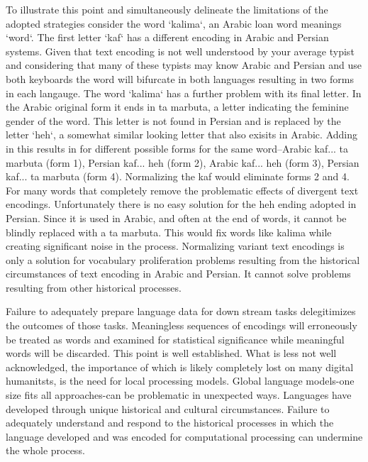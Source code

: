 \documentclass[12pt, oneside]{report}
\begin{document}
\par
To illustrate this point and simultaneously delineate the limitations of the adopted strategies consider the word `kalima`, an Arabic loan word meanings `word`. The first letter `kaf` has a different encoding in Arabic and Persian systems. Given that text encoding is not well understood by your average typist and considering that many of these typists may know Arabic and Persian and use both keyboards the word will bifurcate in both languages resulting in two forms in each langauge. The word `kalima` has a further problem with its final letter. In the Arabic original form it ends in ta marbuta, a letter indicating the feminine gender of the word. This letter is not found in Persian and is replaced by the letter `heh`, a somewhat similar looking letter that also exisits in Arabic. Adding in this results in for different possible forms for the same word–Arabic kaf... ta marbuta (form 1), Persian kaf... heh (form 2), Arabic kaf... heh (form 3), Persian kaf... ta marbuta (form 4). Normalizing the kaf would eliminate forms 2 and 4. For many words that completely remove the problematic effects of divergent text encodings. Unfortunately there is no easy solution for the heh ending adopted in Persian. Since it is used in Arabic, and often at the end of words, it cannot be blindly replaced with a ta marbuta. This would fix words like kalima while creating significant noise in the process. Normalizing variant text encodings is only a solution for vocabulary proliferation problems resulting from the historical circumstances of text encoding in Arabic and Persian. It cannot solve problems resulting from other historical processes.
\par
Failure to adequately prepare language data for down stream tasks delegitimizes the outcomes of those tasks. Meaningless sequences of encodings will erroneously be treated as words and examined for statistical significance while meaningful words will be discarded. This point is well established. What is less not well acknowledged, the importance of which is likely completely lost on many digital humanitsts, is the need for local processing models. Global language models-one size fits all approaches-can be problematic in unexpected ways. Languages have developed through unique historical and cultural circumstances. Failure to adequately understand and respond to the historical processes in which the language developed and was encoded for computational processing can undermine the whole process.
\end{document}
